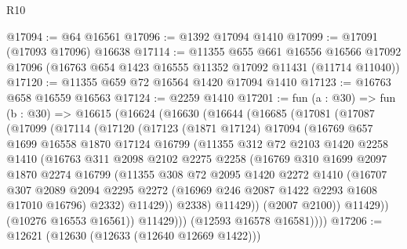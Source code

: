 \begin{lexlean}{R10}
\begin{coremodule}
@17094 := @64 @16561
@17096 := @1392 @17094 @1410
@17099 := @17091 (@17093 @17096) @16638
@17114 := @11355
    @655
    @661
    @16556
    @16566
    @17092
    @17096
    (@16763 @654 @1423 @16555 @11352 @17092 @11431 (@11714 @11040))
@17120 := @11355 @659 @72 @16564 @1420 @17094 @1410
@17123 := @16763 @658 @16559 @16563
@17124 := @2259 @1410
@17201 := fun (a : @30) =>
  fun (b : @30) =>
  @16615
    (@16624
      (@16630
        (@16644
          (@16685
            (@17081
              (@17087
                (@17099
                  (@17114
                    (@17120
                      (@17123
                        (@1871 @17124)
                        @17094
                        (@16769
                          @657
                          @1699
                          @16558
                          @1870
                          @17124
                          @16799
                          (@11355
                            @312
                            @72
                            @2103
                            @1420
                            @2258
                            @1410
                            (@16763
                              @311
                              @2098
                              @2102
                              @2275
                              @2258
                              (@16769
                                @310
                                @1699
                                @2097
                                @1870
                                @2274
                                @16799
                                (@11355
                                  @308
                                  @72
                                  @2095
                                  @1420
                                  @2272
                                  @1410
                                  (@16707
                                    @307
                                    @2089
                                    @2094
                                    @2295
                                    @2272
                                    (@16969 @246 @2087 @1422 @2293 @1608 @17010 @16796)
                                    @2332)
                                  @11429))
                              @2338)
                            @11429))
                        (@2007 @2100))
                      @11429))
                  (@10276 @16553 @16561))
                @11429)))
          (@12593 @16578 @16581))))
@17206 := @12621 (@12630 (@12633 (@12640 @12669 @1422)))

\end{coremodule}
\end{lexlean}
